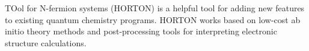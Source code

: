 TOol for N-fermion systems (HORTON) is a helpful tool for adding new features to existing quantum chemistry programs. HORTON works based on low-cost ab initio theory methods and post-processing tools for interpreting electronic structure calculations.